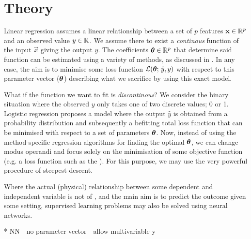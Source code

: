 \section{Theory}\label{sec:theory}

Linear regression assumes a linear relationship between a set of $p$ features $\vec{x}\in\RR[p]$ and an observed value $y\in\RR$. We assume there to exist a \textit{continous} function of the input $\vec{x}$ giving the output $\hat{y}$. The coefficients $\svec{\theta}\in\RR[p]$ that determine said function can be estimated using a variety of methods, as discussed in \projectOne. In any case, the aim is to minimise some loss function $\mathcal{L}(\svec{\theta};\,\hat{y}, y)$ with respect to this parameter vector ($\svec{\theta}$) describing what we sacrifice by using this exact model. 

What if the function we want to fit is \textit{discontinous}? We consider the binary situation where the observed $y$ only takes one of two discrete values; 0 or 1. Logistic regression proposes a model where the output $\hat{y}$ is obtained from  a probability distribution and subsequently a befitting total loss function that can be minimised with respect to a set of parameters $\svec{\theta}$. Now, instead of using the method-specific regression algorithms for finding the optimal $\svec{\theta}$, we can change modus operandi and focus solely on the minimisation of some objective function (e.g. a loss function such as the ). For this purpose, we may use the very powerful procedure of steepest descent.

Where the actual (physical) relationship between some dependent and independent variable is not of , and the main aim is to predict the outcome given some setting, supervised learning problems may also be solved using neural networks. 

\par{*} NN - no parameter vector - allow multivariable y




